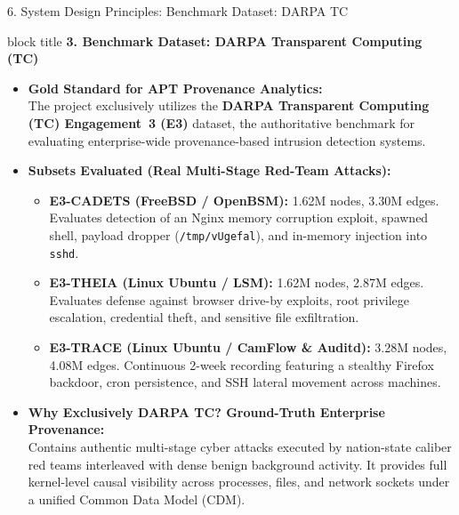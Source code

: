 \documentclass[aspectratio=169,10pt]{beamer}
\begin{document}
\begin{frame}[t]{6. System Design Principles: Benchmark Dataset: DARPA TC}
\vspace{-0.2em}
\begin{beamercolorbox}[rounded=true,shadow=false,sep=0.35em,wd=\textwidth]{block title}
\textbf{\scriptsize 3. Benchmark Dataset: DARPA Transparent Computing (TC)}
\end{beamercolorbox}
\vspace{0.1em}
{\fontsize{7.2pt}{9.8pt}\selectfont
\begin{itemize}\itemsep0.18em
  \item \textbf{Gold Standard for APT Provenance Analytics:}\\
  The project exclusively utilizes the \textbf{DARPA Transparent Computing (TC) Engagement~3 (E3)} dataset, the authoritative benchmark for evaluating enterprise-wide provenance-based intrusion detection systems.
  \item \textbf{Subsets Evaluated (Real Multi-Stage Red-Team Attacks):}
    \begin{itemize}\itemsep0.10em
      \item \textbf{E3-CADETS (FreeBSD / OpenBSM):} 1.62M nodes, 3.30M edges. Evaluates detection of an Nginx memory corruption exploit, spawned shell, payload dropper (\texttt{/tmp/vUgefal}), and in-memory injection into \texttt{sshd}.
      \item \textbf{E3-THEIA (Linux Ubuntu / LSM):} 1.62M nodes, 2.87M edges. Evaluates defense against browser drive-by exploits, root privilege escalation, credential theft, and sensitive file exfiltration.
      \item \textbf{E3-TRACE (Linux Ubuntu / CamFlow \& Auditd):} 3.28M nodes, 4.08M edges. Continuous 2-week recording featuring a stealthy Firefox backdoor, cron persistence, and SSH lateral movement across machines.
    \end{itemize}
  \item \textbf{Why Exclusively DARPA TC? Ground-Truth Enterprise Provenance:}\\
  Contains authentic multi-stage cyber attacks executed by nation-state caliber red teams interleaved with dense benign background activity. It provides full kernel-level causal visibility across processes, files, and network sockets under a unified Common Data Model (CDM).
\end{itemize}
}
\end{frame}
\end{document}
